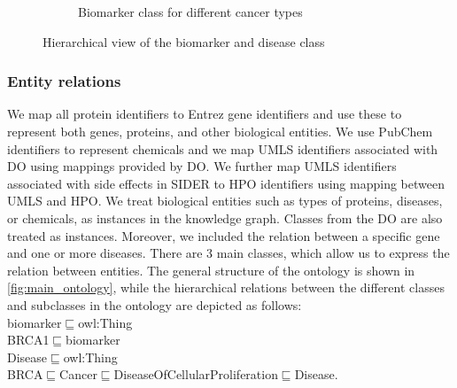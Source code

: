 \begin{figure}[h]
\begin{subfigure}{.48\linewidth}
		\caption{Biomarker class for different cancer types}
        \label{fig:annotations_for_genes}
	\end{subfigure}

	\caption{Hierarchical view of the biomarker and disease class} 
	\label{fig:property_enrich_annotations_for_genes}
	\vspace{-4mm}
\end{figure}

\subsubsection{Entity relations} 
We map all protein identifiers to Entrez gene identifiers and use these to represent both genes, proteins, and other biological entities. We use PubChem identifiers to represent chemicals and we map UMLS identifiers associated with DO using mappings provided by DO. We further map UMLS identifiers associated with side effects in SIDER to HPO identifiers using mapping between UMLS and HPO. We treat biological entities such as types of proteins, diseases, or chemicals, as instances in the knowledge graph. Classes from the DO are also treated as instances. Moreover, we included  the relation between a specific gene and one or more diseases. There are 3 main classes, which allow us to express the relation between entities. The general structure of the ontology is shown in \cref{fig:main_ontology}, while the hierarchical relations between the different classes and subclasses in the ontology are depicted as follows: \\
\vspace{-4mm}
{\scriptsize \noindent biomarker$\sqsubseteq$owl:Thing \\
BRCA1$\sqsubseteq$biomarker\\
Disease$\sqsubseteq$owl:Thing\\
BRCA$\sqsubseteq$Cancer$\sqsubseteq$DiseaseOfCellularProliferation$\sqsubseteq$Disease.}\\
\vspace{-4mm}

